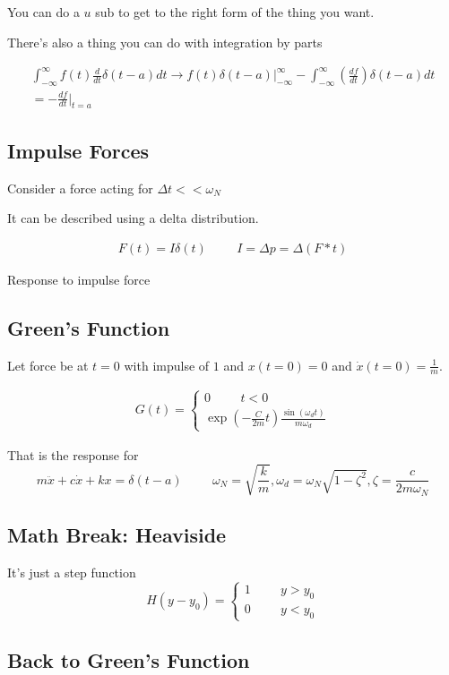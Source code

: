\documentclass[fleqn]{report}
\newcommand{\hp}{\hspace{1cm}}
\newcommand{\equations} [1] {
\begin{gather*}
#1
\end{gather*}
}
\begin{document}
You can do a $u$ sub to get to the right form of the thing 
you want. 

There's also a thing you can do with integration by parts 
\equations{
\int^{\infty}_{-\infty} f(t) \frac{d}{dt} \delta(t - a)dt 
\rightarrow 
f(t) \delta(t - a)  
\Big|^{\infty}_{-\infty}
-
\int^{\infty}_{-\infty} (\frac{df}{dt}) \delta(t - a) dt 
\\
=
- \frac{df}{dt} 
\Big|_{t = a}
}

\subsection{Impulse Forces}
Consider a force acting for $\Delta t << \omega_N$

It can be described using a delta distribution. 

\equations{
    F(t) = I \delta(t)
    \hp 
    I = \Delta p = \Delta(F * t)
}
Response to impulse force 

\subsection{Green's Function}
Let force be at $t = 0$ with impulse of $1$ and 
$x(t = 0) = 0$ and $\dot x(t = 0) = \frac{1}{m}$. 

\equations{
    G(t) = \begin{cases}
    0 \hp t < 0 \\ 
    \exp(- \frac{C}{2m} t) \frac{\sin(\omega_d t)}{m \omega_d}
    \end{cases}
}

That is the response for 
\[
m \ddot x + c \dot x + kx = \delta(t - a)
\hp
\omega_N = \sqrt{\frac{k}{m}}, \omega_d = \omega_N \sqrt{1 - \zeta^2}, \zeta = \frac{c}{2m \omega_N}
\]

\subsection{Math Break: Heaviside}
It's just a step function 
\[
H(y - y_0) = \begin{cases}
1 \hp y > y_0 \\ 
0 \hp y < y_0 
\end{cases}
\]

\subsection{Back to Green's Function}
\end{document}
